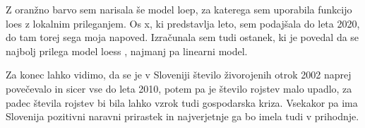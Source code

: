 \documentclass[11pt,a4paper]{article}
\begin{document}
Z oranžno barvo sem narisala še model loep, za katerega sem uporabila funkcijo  loes z lokalnim prileganjem. Os x, ki predstavlja leto, sem podajšala do leta 2020, do tam torej sega moja napoved. Izračunala sem tudi ostanek, ki je povedal da se najbolj prilega model  loess , najmanj pa linearni model.





Za konec lahko vidimo, da se je v Sloveniji število živorojenih otrok 2002 naprej povečevalo in sicer vse do leta 2010, potem pa je število rojstev malo upadlo, za padec števila rojstev bi bila lahko vzrok tudi gospodarska kriza. Vsekakor pa ima Slovenija pozitivni naravni prirastek in najverjetnje ga bo imela tudi v prihodnje.


\end{document}
